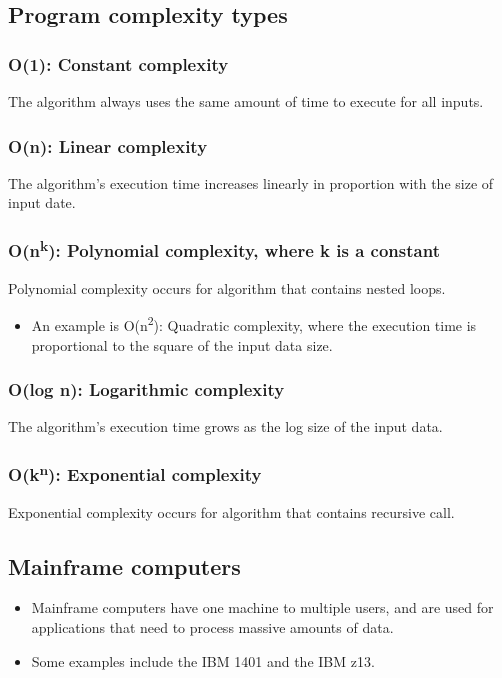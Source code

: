 \documentclass[11pt]{article}
\begin{document}
\subsection{Program complexity types}
\label{sec:org7420266}

\subsubsection{O(1): Constant complexity}
\label{sec:orga576d03}
The algorithm always uses the same amount of time to execute for all inputs.
\subsubsection{O(n): Linear complexity}
\label{sec:orga048e22}
The algorithm's execution time increases linearly in proportion with the size of input date.
\subsubsection{O(n\textsuperscript{k}): Polynomial complexity, where k is a constant}
\label{sec:orga4f8dc0}
Polynomial complexity occurs for algorithm that contains nested loops.
\begin{itemize}
\item An example is O(n\textsuperscript{2}): Quadratic complexity, where the execution time is proportional to the square of the input data size.
\end{itemize}
\subsubsection{O(log n): Logarithmic complexity}
\label{sec:orge622749}
The algorithm's execution time grows as the log size of the input data.
\subsubsection{O(k\textsuperscript{n}): Exponential complexity}
\label{sec:org8e418c0}
Exponential complexity occurs for algorithm that contains recursive call.
\subsection{Mainframe computers}
\label{sec:org9859310}
\begin{itemize}
\item Mainframe computers have one machine to multiple users, and are used for applications that need to process massive amounts of data.
\item Some examples include the IBM 1401 and the IBM z13.
\end{itemize}
\end{document}
